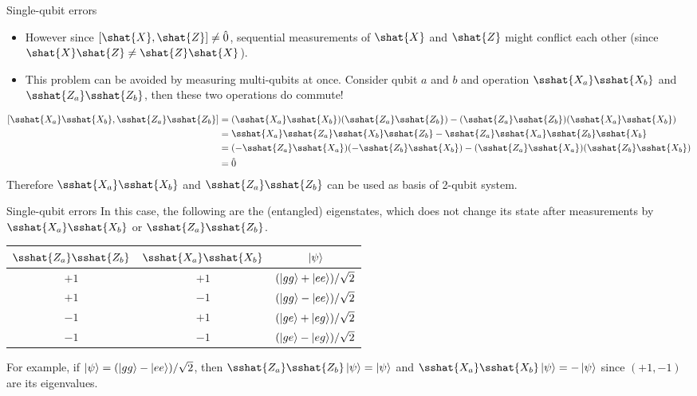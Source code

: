 \documentclass{beamer}
\begin{document}
    \begin{frame}{Single-qubit errors}
        \begin{itemize}
            \item However since $ [\shat{X}, \shat{Z}] \neq \hat{0} $, sequential measurements of $ \shat{X} $ and $ \shat{Z} $ might conflict each other (since $ \shat{X}\shat{Z} \neq \shat{Z}\shat{X} $).
            \item This problem can be avoided by measuring multi-qubits at once. Consider qubit $ a $ and $ b $ and operation $ \sshat{X_a}\sshat{X_b} $ and $ \sshat{Z_a}\sshat{Z_b} $, then these two operations do commute!
        \end{itemize}
        \begin{equation}
        \begin{split}
        [\sshat{X_a}\sshat{X_b}, \sshat{Z_a}\sshat{Z_b}] &= (\sshat{X_a}\sshat{X_b})(\sshat{Z_a}\sshat{Z_b}) - (\sshat{Z_a}\sshat{Z_b})(\sshat{X_a}\sshat{X_b}) \\
        &= \sshat{X_a}\sshat{Z_a}\sshat{X_b}\sshat{Z_b} - \sshat{Z_a}\sshat{X_a}\sshat{Z_b}\sshat{X_b} \\
        &= (-\sshat{Z_a}\sshat{X_a})(-\sshat{Z_b}\sshat{X_b}) - (\sshat{Z_a}\sshat{X_a})(\sshat{Z_b}\sshat{X_b}) \\
        &= \hat{0}
        \end{split}
        \end{equation}
        Therefore $ \sshat{X_a}\sshat{X_b} $ and $ \sshat{Z_a}\sshat{Z_b} $ can be used as basis of 2-qubit system.
    \end{frame}
    
    \begin{frame}{Single-qubit errors}
        In this case, the following are the (entangled) eigenstates, which does not change its state after measurements by $ \sshat{X_a}\sshat{X_b} $ or $ \sshat{Z_a}\sshat{Z_b} $.
        \begin{table}[h]
            \begin{tabular}{|c|c|c|}
                \hline
                $ \sshat{Z_a}\sshat{Z_b} $ & $ \sshat{X_a}\sshat{X_b} $ & $ \ket{\psi} $ \\ \hline
                $ +1 $ & $ +1 $ & $ (\ket{gg} + \ket{ee})/\sqrt{2} $ \\ \hline
                $ +1 $ & $ -1 $ & $ (\ket{gg} - \ket{ee})/\sqrt{2} $ \\ \hline
                $ -1 $ & $ +1 $ & $ (\ket{ge} + \ket{eg})/\sqrt{2} $ \\ \hline
                $ -1 $ & $ -1 $ & $ (\ket{ge} - \ket{eg})/\sqrt{2} $ \\ \hline
            \end{tabular}
        \end{table}
        For example, if $ \ket{\psi} = (\ket{gg} - \ket{ee})/\sqrt{2}$, then $ \sshat{Z_a}\sshat{Z_b}\ket{\psi} = \ket{\psi} $ and $ \sshat{X_a}\sshat{X_b}\ket{\psi} = -\ket{\psi} $ since $ (+1, -1) $ are its eigenvalues.
    \end{frame}
    
\end{document}
